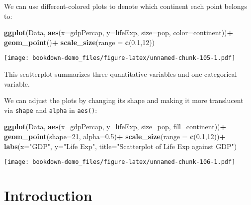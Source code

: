 \documentclass[
]{book}
\newenvironment{Shaded}{\begin{snugshade}}{\end{snugshade}}
\newcommand{\AttributeTok}[1]{\textcolor[rgb]{0.13,0.29,0.53}{#1}}
\newcommand{\DecValTok}[1]{\textcolor[rgb]{0.00,0.00,0.81}{#1}}
\newcommand{\FloatTok}[1]{\textcolor[rgb]{0.00,0.00,0.81}{#1}}
\newcommand{\FunctionTok}[1]{\textcolor[rgb]{0.13,0.29,0.53}{\textbf{#1}}}
\newcommand{\NormalTok}[1]{#1}
\newcommand{\SpecialCharTok}[1]{\textcolor[rgb]{0.81,0.36,0.00}{\textbf{#1}}}
\newcommand{\StringTok}[1]{\textcolor[rgb]{0.31,0.60,0.02}{#1}}
\begin{document}
We can use different-colored plots to denote which continent each point belongs to:

\begin{Shaded}
\begin{Highlighting}[]
\FunctionTok{ggplot}\NormalTok{(Data, }\FunctionTok{aes}\NormalTok{(}\AttributeTok{x=}\NormalTok{gdpPercap, }\AttributeTok{y=}\NormalTok{lifeExp, }\AttributeTok{size=}\NormalTok{pop, }\AttributeTok{color=}\NormalTok{continent))}\SpecialCharTok{+}
  \FunctionTok{geom\_point}\NormalTok{()}\SpecialCharTok{+}
  \FunctionTok{scale\_size}\NormalTok{(}\AttributeTok{range =} \FunctionTok{c}\NormalTok{(}\FloatTok{0.1}\NormalTok{,}\DecValTok{12}\NormalTok{))}
\end{Highlighting}
\end{Shaded}

\texttt{[image: bookdown-demo\_files/figure-latex/unnamed-chunk-105-1.pdf]}

This scatterplot summarizes three quantitative variables and one categorical variable.

We can adjust the plots by changing its shape and making it more translucent via \texttt{shape} and \texttt{alpha} in \texttt{aes()}:

\begin{Shaded}
\begin{Highlighting}[]
\FunctionTok{ggplot}\NormalTok{(Data, }\FunctionTok{aes}\NormalTok{(}\AttributeTok{x=}\NormalTok{gdpPercap, }\AttributeTok{y=}\NormalTok{lifeExp, }\AttributeTok{size=}\NormalTok{pop, }\AttributeTok{fill=}\NormalTok{continent))}\SpecialCharTok{+}
  \FunctionTok{geom\_point}\NormalTok{(}\AttributeTok{shape=}\DecValTok{21}\NormalTok{, }\AttributeTok{alpha=}\FloatTok{0.5}\NormalTok{)}\SpecialCharTok{+}
  \FunctionTok{scale\_size}\NormalTok{(}\AttributeTok{range =} \FunctionTok{c}\NormalTok{(}\FloatTok{0.1}\NormalTok{,}\DecValTok{12}\NormalTok{))}\SpecialCharTok{+}
  \FunctionTok{labs}\NormalTok{(}\AttributeTok{x=}\StringTok{"GDP"}\NormalTok{, }\AttributeTok{y=}\StringTok{"Life Exp"}\NormalTok{, }\AttributeTok{title=}\StringTok{"Scatterplot of Life Exp against GDP"}\NormalTok{)}
\end{Highlighting}
\end{Shaded}

\texttt{[image: bookdown-demo\_files/figure-latex/unnamed-chunk-106-1.pdf]}

\hypertarget{intro}{%
\chapter{Introduction}\label{intro}}
\end{document}
